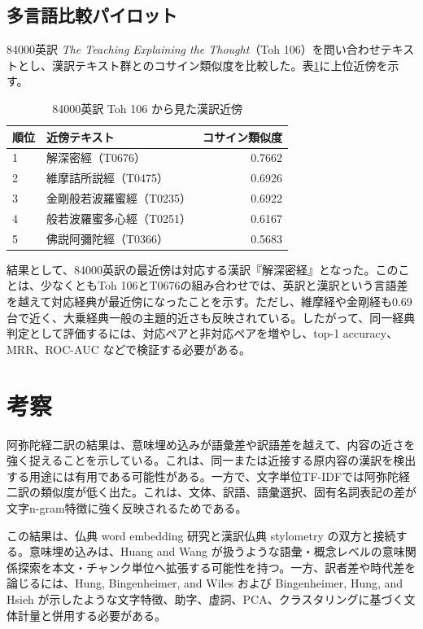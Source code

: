 \documentclass[uplatex,dvipdfmx,11pt,a4paper]{jsarticle}
\begin{document}
\subsection{多言語比較パイロット}

84000英訳 \textit{The Teaching Explaining the Thought}（Toh 106）を問い合わせテキストとし、漢訳テキスト群とのコサイン類似度を比較した。表\ref{tab:multilingual-pilot}に上位近傍を示す。

\begin{table}[H]
\centering
\caption{84000英訳 Toh 106 から見た漢訳近傍}
\label{tab:multilingual-pilot}
\begin{tabular}{llr}
\toprule
順位 & 近傍テキスト & コサイン類似度 \\
\midrule
1 & 解深密經（T0676） & 0.7662 \\
2 & 維摩詰所説經（T0475） & 0.6926 \\
3 & 金剛般若波羅蜜經（T0235） & 0.6922 \\
4 & 般若波羅蜜多心經（T0251） & 0.6167 \\
5 & 佛説阿彌陀經（T0366） & 0.5683 \\
\bottomrule
\end{tabular}
\end{table}

結果として、84000英訳の最近傍は対応する漢訳『解深密経』となった。このことは、少なくともToh 106とT0676の組み合わせでは、英訳と漢訳という言語差を越えて対応経典が最近傍になったことを示す。ただし、維摩経や金剛経も0.69台で近く、大乗経典一般の主題的近さも反映されている。したがって、同一経典判定として評価するには、対応ペアと非対応ペアを増やし、top-1 accuracy、MRR、ROC-AUC などで検証する必要がある。

\section{考察}

阿弥陀経二訳の結果は、意味埋め込みが語彙差や訳語差を越えて、内容の近さを強く捉えることを示している。これは、同一または近接する原内容の漢訳を検出する用途には有用である可能性がある。一方で、文字単位TF-IDFでは阿弥陀経二訳の類似度が低く出た。これは、文体、訳語、語彙選択、固有名詞表記の差が文字n-gram特徴に強く反映されるためである。

この結果は、仏典 word embedding 研究と漢訳仏典 stylometry の双方と接続する。意味埋め込みは、Huang and Wang が扱うような語彙・概念レベルの意味関係探索\cite{huang2023}を本文・チャンク単位へ拡張する可能性を持つ。一方、訳者差や時代差を論じるには、Hung, Bingenheimer, and Wiles および Bingenheimer, Hung, and Hsieh が示したような文字特徴、助字、虚詞、PCA、クラスタリングに基づく文体計量\cite{hung2010,bingenheimer2017}と併用する必要がある。
\end{document}
